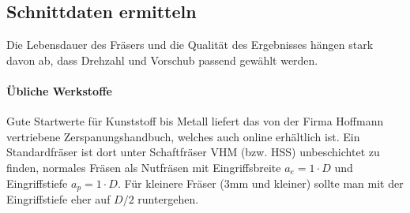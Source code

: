 \documentclass{\basedir/fablab-document}
\begin{document}
\subsection{Schnittdaten ermitteln}

Die Lebensdauer des Fräsers und die Qualität des Ergebnisses hängen stark davon ab, dass Drehzahl und Vorschub passend gewählt werden.

\paragraph{Übliche Werkstoffe} Gute Startwerte für Kunststoff bis Metall liefert das von der Firma Hoffmann vertriebene Zerspanungshandbuch, welches auch online erhältlich ist. Ein Standardfräser ist dort unter Schaftfräser VHM (bzw. HSS) unbeschichtet zu finden, normales Fräsen als Nutfräsen mit Eingriffsbreite $a_e=1\cdot D$ und Eingriffstiefe $a_p=1 \cdot D$. Für kleinere Fräser (3mm und kleiner) sollte man mit der Eingriffstiefe eher auf $D/2$ runtergehen.
\end{document}
